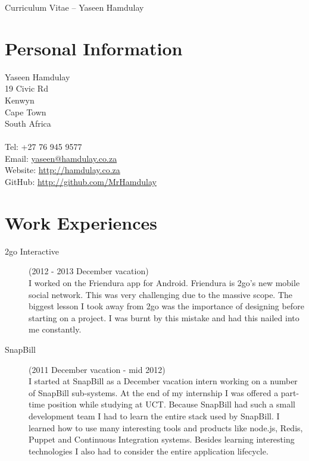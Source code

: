 \documentclass[margin,line,a4paper]{resume}
\begin{document}
    {\sc \Large Curriculum Vitae -- Yaseen Hamdulay}
    \begin{resume}
        \vspace{0.5cm}

        \section{\mysidestyle Personal Information}
            Yaseen Hamdulay\\
            19 Civic Rd\\ %
            Kenwyn\\
            Cape Town\\
            South Africa\\
            \\
            Tel: +27 76 945 9577\\
            Email: \href{mailto:yaseen@hamdulay.co.za}{yaseen@hamdulay.co.za}\\
            Website: \href{http://hamdulay.co.za}{http://hamdulay.co.za}\\
            GitHub: \href{http://github.com/MrHamdulay}{http://github.com/MrHamdulay}\\

        \section{\mysidestyle Work Experiences}
            \begin{description}
                \item[2go Interactive] (2012 - 2013 December vacation) \\
                    I worked on the Friendura app for Android. Friendura is 2go's new mobile social network. This was very challenging due to the massive scope. The biggest lesson I took away from 2go was the importance of designing before starting on a project. I was burnt by this mistake and had this nailed into me constantly.
                \item[SnapBill] (2011 December vacation - mid 2012) \\
                    I started at SnapBill as a December vacation intern working on a number of SnapBill sub-systems. At the end of my internship I was offered a part-time position while studying at UCT. Because SnapBill had such a small development team I had to learn the entire stack used by SnapBill. I learned how to use many interesting tools and products like node.js, Redis, Puppet and Continuous Integration systems. Besides learning interesting technologies I also had to
                    consider the entire application lifecycle. 


\end{description}
\end{resume}
\end{document}
